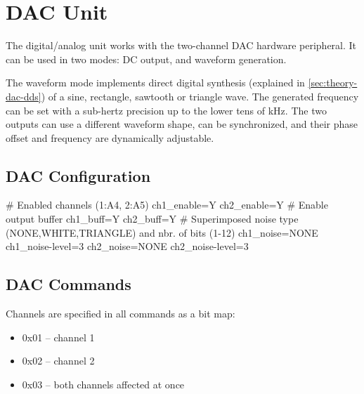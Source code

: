 \section{DAC Unit}

The digital/analog unit works with the two-channel \gls{DAC} hardware peripheral. It can be used in two modes: \gls{DC} output, and waveform generation.

The waveform mode implements direct digital synthesis (explained in \cref{sec:theory-dac-dds}) of a sine, rectangle, sawtooth or triangle wave. The generated frequency can be set with a sub-hertz precision up to the lower tens of kHz. The two outputs can use a different waveform shape, can be synchronized, and their phase offset and frequency are dynamically adjustable.

\subsection{DAC Configuration}

\begin{inicode}
# Enabled channels (1:A4, 2:A5)
ch1_enable=Y
ch2_enable=Y
# Enable output buffer
ch1_buff=Y
ch2_buff=Y
# Superimposed noise type (NONE,WHITE,TRIANGLE) and nbr. of bits (1-12)
ch1_noise=NONE
ch1_noise-level=3
ch2_noise=NONE
ch2_noise-level=3
\end{inicode}

\subsection{DAC Commands}

Channels are specified in all commands as a bit map:

\begin{itemize}[nosep]
	\item 0x01 -- channel 1
	\item 0x02 -- channel 2
	\item 0x03 -- both channels affected at once
\end{itemize}

